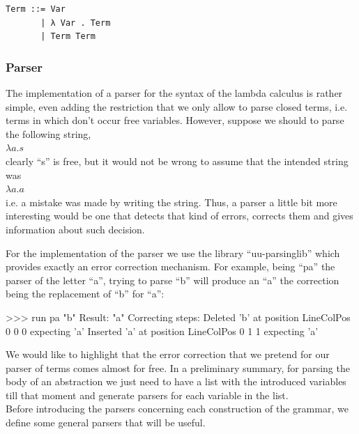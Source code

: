 \documentclass[a4paper,10pt]{article}
\newenvironment{code}{\footnotesize\verbatim}{\endverbatim\normalsize}
\begin{document}
\begin{lstlisting}
Term ::= Var
       | λ Var . Term
       | Term Term
\end{lstlisting}

\subsubsection{Parser}

The implementation of a parser for the syntax of the lambda calculus is rather simple,
even adding the restriction that we only allow to parse closed terms, i.e. terms in which
don't occur free variables. However, suppose we should to parse the following string,\\

$\lambda a . s$\\

clearly ``s'' is free, but it would not be wrong to assume that the intended string was\\

$\lambda a . a$\\

i.e. a mistake was made by writing the string. Thus, a parser a little bit
more interesting would be one that detects that kind of errors, corrects them
and gives information about such decision.

For the implementation of the parser we use the library ``uu-parsinglib''
which provides exactly an error correction mechanism. For example, being ``pa'' the
parser of the letter ``a'', trying to parse ``b'' will produce an ``a'' the correction
being the replacement of ``b'' for ``a'':

\begin{code}
 >>> run pa  "b"
     Result: "a"
     Correcting steps: 
       Deleted   'b' at position LineColPos 0 0 0 expecting 'a'
       Inserted  'a' at position LineColPos 0 1 1 expecting 'a'
\end{code}

We would like to highlight that the error correction that we pretend for our parser
of terms comes almost for free. In a preliminary summary, for parsing the body of an 
abstraction we just need to have a list with the introduced variables till that
moment and generate parsers for each variable in the list.\\

Before introducing the parsers concerning each construction of the grammar, 
we define some general parsers that will be useful.
\end{document}
